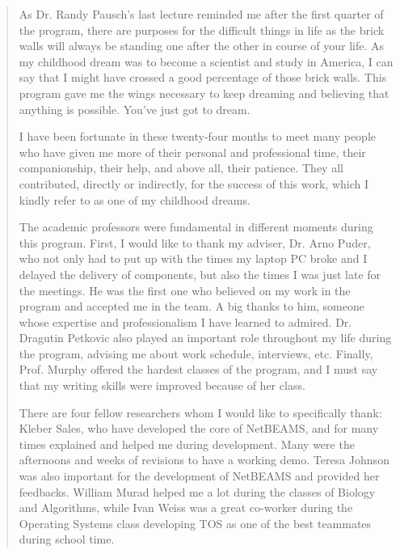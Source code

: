 \documentclass[12pt,oneside]{sfsuthesis}
\theoremstyle{plain} %
\theoremstyle{definition}  %
\theoremstyle{remark}  %
\begin{document}
\begin{quote}
\noindent

As Dr. Randy Pausch's last lecture reminded me after the first quarter of the
program, there are purposes for the difficult things in life as the brick walls
will always be standing one after the other in course of your life. As my
childhood dream was to become a scientist and study in America, I can say that
I might have crossed a good percentage of those brick walls. This program gave
me the wings necessary to keep dreaming and believing that anything is
possible. You've just got to dream.

I have been fortunate in these twenty-four months to meet many people who have
given me more of their personal and professional time, their companionship,
their help, and above all, their patience. They all contributed, directly or
indirectly, for the success of this work, which I kindly refer to as one of my
childhood dreams.

The academic professors were fundamental in different moments during this
program. First, I would like to thank my adviser, Dr. Arno Puder, who not only
had to put up with the times my laptop PC broke and I delayed the delivery of
components, but also the times I was just late for the meetings. He was the 
first one who believed on my work in the program and accepted me in the
team. A big thanks to him, someone whose expertise and professionalism I have
learned to admired. Dr. Dragutin Petkovic also played an important role
throughout my life during the program, advising me about work schedule,
interviews, etc. Finally, Prof. Murphy offered the hardest classes of the
program, and I must say that my writing skills were improved because of her
class.

There are four fellow researchers whom I would like to specifically thank:
Kleber Sales, who have developed the core of NetBEAMS, and for many times
explained and helped me during development. Many were the afternoons and weeks
of revisions to have a working demo. Teresa Johnson was also important for the
development of NetBEAMS and provided her feedbacks. William Murad helped me a
lot during the classes of Biology and Algorithms, while Ivan Weiss was a great
co-worker during the Operating Systems class developing TOS as one of the best
teammates during school time.


\end{quote}
\end{document}
